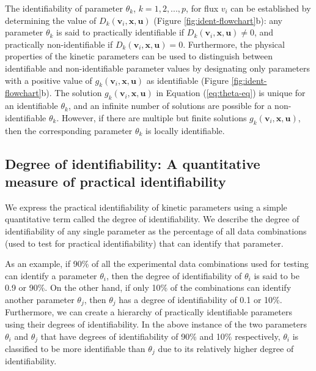 \documentclass[10pt]{article}
\begin{document}
	The identifiability of parameter $\theta_k$, $k = {1, 2, ..., p}$, for flux $v_i$ can be established by determining the value of $D_k(\mathbf{v}_i, \mathbf{x}, \mathbf{u})$ (Figure \ref{fig:ident-flowchart}b): any parameter $\theta_k$ is said to practically identifiable if $D_k(\mathbf{v}_i, \mathbf{x}, \mathbf{u})\neq0$, and practically non-identifiable if $D_k(\mathbf{v}_i, \mathbf{x}, \mathbf{u}) = 0$. Furthermore, the physical properties of the kinetic parameters can be used to distinguish between identifiable and non-identifiable parameter values by designating only parameters with a positive value of $g_k(\mathbf{v}_i, \mathbf{x}, \mathbf{u})$ as identifiable (Figure \ref{fig:ident-flowchart}b). The solution $g_k(\mathbf{v}_i, \mathbf{x}, \mathbf{u})$ in Equation (\ref{eq:theta-eq}) is unique for an identifiable $\theta_k$, and an infinite number of solutions are possible for a non-identifiable $\theta_k$. However, if there are multiple but finite solutions $g_k(\mathbf{v}_i, \mathbf{x}, \mathbf{u})$, then the corresponding parameter $\theta_k$ is locally identifiable.
	
	
	\subsection{Degree of identifiability: A quantitative measure of practical identifiability}\label{sec:degree_of_identifiability}
	We express the practical identifiability of kinetic parameters using a simple quantitative term called the degree of identifiability. We describe the degree of identifiability of any single parameter as the percentage of all data combinations (used to test for practical identifiability) that can identify that parameter. 
	
	As an example, if 90\% of all the experimental data combinations used for testing can identify a parameter $\theta_i$, then the degree of identifiability of $\theta_i$ is said to be 0.9 or 90\%. On the other hand, if only 10\% of the combinations can identify another parameter $\theta_j$, then $\theta_j$ has a degree of identifiability of 0.1 or 10\%. Furthermore, we can create a hierarchy of practically identifiable parameters using their degrees of identifiability. In the above instance of the two parameters $\theta_i$ and $\theta_j$ that have degrees of identifiability of 90\% and 10\% respectively, $\theta_i$ is classified to be more identifiable than $\theta_j$ due to its relatively higher degree of identifiability. 
	
\end{document}
